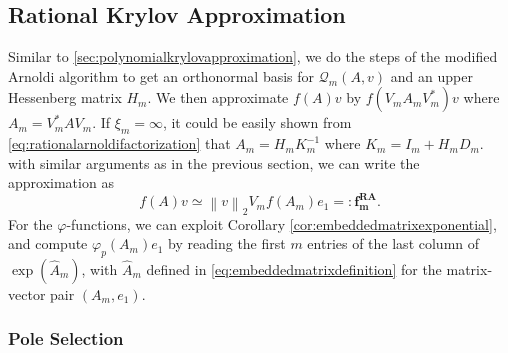 \subsection{Rational Krylov Approximation}
\label{sec:rationalkrylovapproximation}
Similar to \autoref{sec:polynomialkrylovapproximation}, we do the steps of the modified Arnoldi
algorithm to get an orthonormal basis for $\mathcal{Q}_m(A, v)$ and an upper
Hessenberg matrix $H_m$. We then approximate $f(A)v$ by
$f(V_m A_m V_m^*)v$ where $A_m = V_m^* A V_m$. If $\xi_m = \infty$,
it could be easily shown from \eqref{eq:rationalarnoldifactorization} that
$A_m = H_m K_m^{-1}$ where $K_m = I_m + H_m D_m$. with similar arguments
as in the previous section, we can write the approximation as
\begin{equation}
    \label{eq:rationalkrylovapproximation}
    f(A)v \simeq \left\| v \right\|_{2} V_m f(A_m) e_1 =: \mathbf{f_{m}^{RA}}.
\end{equation}
For the $\varphi$-functions, we can exploit Corollary \ref{cor:embeddedmatrixexponential},
and compute $\varphi_p(A_m) e_1$ by reading the first $m$ entries of the last column of
$\exp(\hat{A}_m)$, with $\hat{A}_m$ defined in \eqref{eq:embeddedmatrixdefinition}
for the matrix-vector pair $(A_m, e_1)$.

\subsubsection{Pole Selection}

